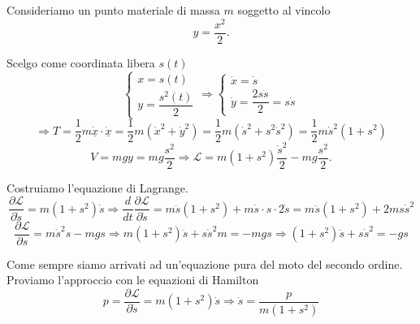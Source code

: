 \begin{example}{}
Consideriamo un punto materiale di massa \(m\) soggetto al vincolo
\[
y=\frac{x^2}{2}.
\]

\begin{center}
\end{center}

Scelgo come coordinata libera \(s(t)\)
\[
\begin{cases}
x=s(t)\\[4pt]
y=\dfrac{s^2(t)}{2}
\end{cases}
\Rightarrow
\begin{cases}
\dot{x}=\dot{s}\\[4pt]
\dot{y}=\dfrac{2s\dot{s}}{2}=s\dot{s}
\end{cases}
\]
\[
\Rightarrow
T
=
\frac{1}{2}m\dot{\underline{x}}\cdot\dot{\underline{x}}
=
\frac{1}{2}m(\dot{x}^2+\dot{y}^2)
=
\frac{1}{2}m(\dot{s}^2+s^2\dot{s}^2)
=
\frac{1}{2}m\dot{s}^2(1+s^2)
\]
\[
V=mgy=mg\frac{s^2}{2}
\Rightarrow
\mathcal{L}
=
m(1+s^2)\frac{\dot{s}^2}{2}
-
mg\frac{s^2}{2}.
\]

Costruiamo l'equazione di Lagrange.
\[
\frac{\partial\mathcal{L}}{\partial\dot{s}}
=
m(1+s^2)\dot{s}
\Rightarrow
\frac{d}{dt}\frac{\partial\mathcal{L}}{\partial\dot{s}}
=
m\ddot{s}(1+s^2)+m\dot{s}\cdot s\cdot 2\dot{s}
=
m\ddot{s}(1+s^2)+2ms\dot{s}^2
\]
\[
\frac{\partial\mathcal{L}}{\partial s}
=
m\dot{s}^2s-mgs
\Rightarrow
m(1+s^2)\ddot{s}+s\dot{s}^2m=-mgs
\Rightarrow
(1+s^2)\ddot{s}+s\dot{s}^2=-gs
\]

Come sempre siamo arrivati ad un'equazione pura del moto del secondo ordine.
Proviamo l'approccio con le equazioni di Hamilton
\[
p=
\frac{\partial\mathcal{L}}{\partial\dot{s}}
=
m(1+s^2)\dot{s}
\Rightarrow
\dot{s}
=
\frac{p}{m(1+s^2)}
\]


\end{example}
